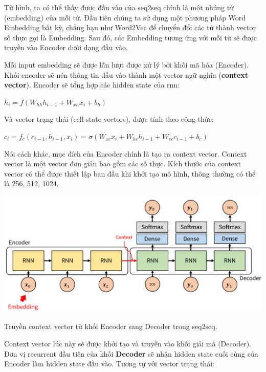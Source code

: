 \documentclass[a4paper, 12pt, openany]{book}
\begin{document}
Từ hình, ta có thể thấy được đầu vào của \ac{seq2seq} chính là một nhúng từ (embedding) của mỗi từ.
Đầu tiên chúng ta sử dụng
một phương pháp Word Embedding bất kỳ, chẳng hạn như Word2Vec để chuyển
đổi các từ thành vector số thực gọi là Embedding. Sau đó, các Embedding tương ứng với
mỗi từ sẽ được truyền vào Encoder dưới dạng đầu vào.

Mỗi input embedding sẽ được lần lượt được xử lý bởi khối mã hóa (Encoder).
Khối encoder sẽ nén thông tin đầu vào thành một vector ngữ nghĩa (\textbf{context vector}). Encoder sẽ tổng hợp các hidden state của \ac{rnn}:

\begin{center}
    \(h_i = f(W_{hh}h_{i-1} + W_{xh}x_i + b_h)\)
\end{center}

Và vector trạng thái (cell state vectors), được tính theo công thức: 

\begin{center}
    \(c_i = f_c(c_{i-1}, h_{i-1}, x_i) = \sigma(W_{xc}x_i + W_{hc}h_{i-1} + W_{cc}c_{i-1} + b_c)\)
\end{center}


Nói cách khác, mục đích của Encoder chính là tạo ra context vector. Context vector
là một vector đơn giản bao gồm các số thực. Kích thước của context vector có thể được
thiết lập ban đầu khi khởi tạo mô hình, thông thường có thể là 256, 512, 1024.

\begin{minipage}{\linewidth}
    \captionsetup{type=figure}
    \centering
    \includegraphics[width=\linewidth]{./assets/images/seq2seq_detail.png}
    \caption{Truyền context vector từ khối Encoder sang Decoder trong \ac{seq2seq}.\cite{sutskever2014sequence}}
\end{minipage}
\vspace{0.5cm}

Context vector lúc này sẽ được khởi tạo và truyền vào khối giải mã (Decoder).
Đơn vị recurrent đầu tiên của khối \textbf{Decoder} sẽ nhận hidden state cuối cùng của Encoder làm hidden state đầu vào.
Tương tự với vector trạng thái:
\end{document}
